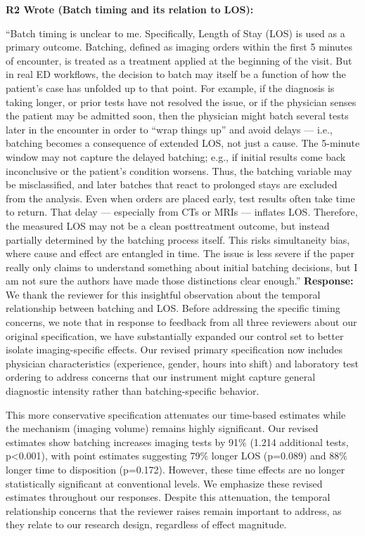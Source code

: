 \documentclass[11pt]{article}
\newenvironment{quote2}
{ \bigskip
\noindent
         \small\em
         \baselineskip=14pt
}
\newcommand{\1}{\hbox{\rm 1\kern-.35em 1}}
\begin{document}
\begin{quote2}
\textbf{R2 Wrote (Batch timing and its relation to LOS):}

\noindent``Batch timing is unclear to me. Specifically, Length of Stay (LOS) is used as a primary outcome. Batching, defined as imaging orders within the first 5 minutes of encounter, is treated as a treatment applied at the beginning of the visit. But in real ED workflows, the decision to batch may itself be a function of how the patient’s case has unfolded up to that point. For example, if the diagnosis is taking longer, or prior tests have not resolved the issue, or if the physician senses the patient may be admitted soon, then the physician might batch several tests later in the encounter in order to “wrap things up” and avoid delays — i.e., batching becomes a consequence of extended LOS, not just a cause. The 5-minute window may not capture the delayed batching; e.g., if initial results come back inconclusive or the patient’s condition worsens. Thus, the batching variable may be misclassified, and later batches that react to prolonged stays are excluded from the analysis. Even when orders are placed early, test results often take time to return. That delay — especially from CTs or MRIs — inflates LOS. Therefore, the measured LOS may not be a clean posttreatment outcome, but instead partially determined by the batching process itself. This risks simultaneity bias, where cause and effect are entangled in time. The issue is less severe if the paper really only claims to understand something about initial batching decisions, but I am not sure the authors have made those distinctions clear enough.” 
\end{quote2}

\noindent\textbf{Response:} \color{blue}We thank the reviewer for this insightful observation about the temporal relationship between batching and LOS. Before addressing the specific timing concerns, we note that in response to feedback from all three reviewers about our original specification, we have substantially expanded our control set to better isolate imaging-specific effects. Our revised primary specification now includes physician characteristics (experience, gender, hours into shift) and laboratory test ordering to address concerns that our instrument might capture general diagnostic intensity rather than batching-specific behavior. 

This more conservative specification attenuates our time-based estimates while the mechanism (imaging volume) remains highly significant. Our revised estimates show batching increases imaging tests by 91\% (1.214 additional tests, p<0.001), with point estimates suggesting 79\% longer LOS (p=0.089) and 88\% longer time to disposition (p=0.172). However, these time effects are no longer statistically significant at conventional levels. We emphasize these revised estimates throughout our responses. Despite this attenuation, the temporal relationship concerns that the reviewer raises remain important to address, as they relate to our research design, regardless of effect magnitude.
\end{document}
